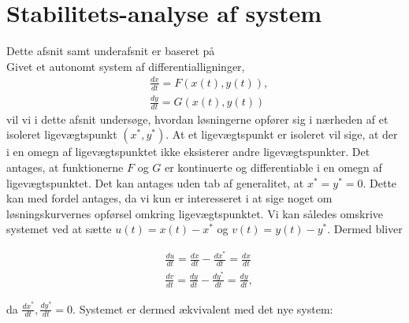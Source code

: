 \section{Stabilitets-analyse af system}
Dette afsnit samt underafsnit er baseret på \citep[afsnit 7.3]{EP} \\
Givet et autonomt system af differentialligninger,
\begin{equation}
\label{stab1}
    \begin{aligned}
    &\frac{dx}{dt}=F(x(t),y(t)),\\ 
    &\frac{dy}{dt}=G(x(t),y(t))
    \end{aligned}
\end{equation}
vil vi i dette afsnit undersøge, hvordan løsningerne opfører sig i nærheden af et isoleret ligevægtspunkt $(x^*,y^*)$. At et ligevægtspunkt er isoleret vil sige, at der i en omegn af ligevægtspunktet ikke eksisterer andre ligevægtspunkter. Det antages, at funktionerne $F$ og $G$ er kontinuerte og differentiable i en omegn af ligevægtspunktet.
Det kan antages uden tab af generalitet, at $x^*=y^*=0$. Dette kan med fordel antages, da vi
kun er interesseret i at sige noget om løsningskurvernes opførsel omkring ligevægtspunktet. Vi kan således omskrive systemet ved at sætte $u(t)=x(t)-x^*$ og $v(t)=y(t)-y^*$. Dermed bliver

\begin{equation*}
    \begin{aligned}
    &\frac{du}{dt}=\frac{dx}{dt}-\frac{dx^*}{dt}=\frac{dx}{dt}\\ 
    &\frac{dv}{dt}=\frac{dy}{dt}-\frac{dy^*}{dt}=\frac{dy}{dt},
    \end{aligned}
\end{equation*}

da $\frac{dx^*}{dt},\frac{dy^*}{dt}=0$. Systemet er dermed ækvivalent med det nye system:

